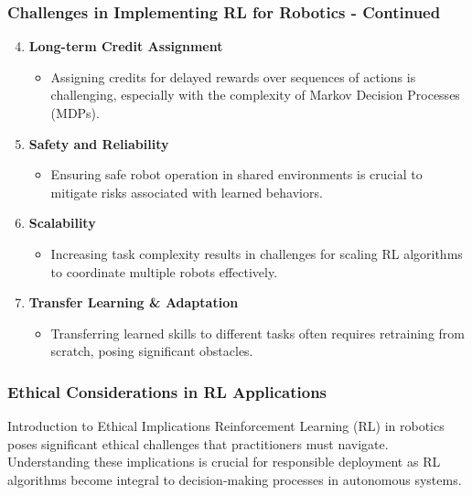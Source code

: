 \documentclass{beamer}
\begin{document}
\begin{frame}[fragile]
    \frametitle{Challenges in Implementing RL for Robotics - Continued}
    \begin{enumerate}
        \setcounter{enumi}{3}
        \item \textbf{Long-term Credit Assignment}
        \begin{itemize}
            \item Assigning credits for delayed rewards over sequences of actions is challenging, especially with the complexity of Markov Decision Processes (MDPs).
        \end{itemize}

        \item \textbf{Safety and Reliability}
        \begin{itemize}
            \item Ensuring safe robot operation in shared environments is crucial to mitigate risks associated with learned behaviors.
        \end{itemize}

        \item \textbf{Scalability}
        \begin{itemize}
            \item Increasing task complexity results in challenges for scaling RL algorithms to coordinate multiple robots effectively.
        \end{itemize}

        \item \textbf{Transfer Learning \& Adaptation}
        \begin{itemize}
            \item Transferring learned skills to different tasks often requires retraining from scratch, posing significant obstacles.
        \end{itemize}
    \end{enumerate}
\end{frame}

\begin{frame}[fragile]
    \frametitle{Ethical Considerations in RL Applications}
    \begin{block}{Introduction to Ethical Implications}
        Reinforcement Learning (RL) in robotics poses significant ethical challenges that practitioners must navigate. Understanding these implications is crucial for responsible deployment as RL algorithms become integral to decision-making processes in autonomous systems.
    \end{block}
\end{frame}
\end{document}
